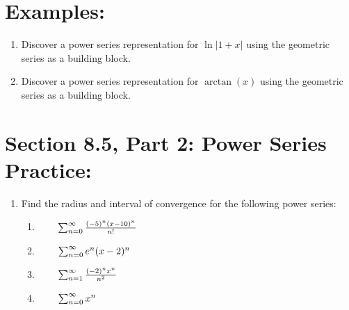 \documentclass[10pt]{article}
\begin{document}




\section*{Examples:}

\begin{enumerate}[{Example } 1:]
\addtocounter{enumi}{3}

\item Discover a power series representation for \(\ln|1+x|\) using the geometric series as a building block.
\vfill


\item Discover a power series representation for \(\arctan(x)\) using the geometric series as a building block.
\vfill

%
\end{enumerate}

\pagebreak

\section*{Section 8.5, Part 2: Power Series Practice:}

\begin{enumerate}[{Problem }1:]
\item Find the radius and interval of convergence for the following power series:

\begin{enumerate}

\item \(\qquad \sum_{n=0}^\infty \frac{(-5)^n (x-10)^n}{n!}\)

\vfill%

\item \(\qquad \sum_{n=0}^\infty e^n(x-2)^n\)

\vfill%

\item \(\qquad \sum_{n=1}^\infty \frac{(-2)^n x^n}{n^2}\)

\vfill%

\item \(\qquad \sum_{n=0}^\infty x^n\)

\vfill%

\end{enumerate}

\end{enumerate}

\end{document}
